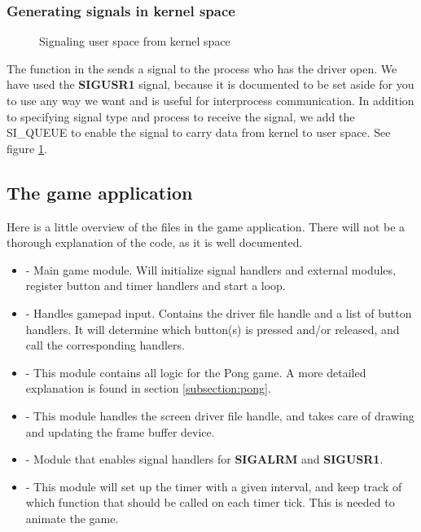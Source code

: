 \subsubsection{Generating signals in kernel space}
\begin{figure}[h]
	\centering
	
	\caption{Signaling user space from kernel space}
	\label{fig:signal-user-application}
\end{figure}
The  function in the  sends a signal to the process who has the driver open. We have used the \textbf{SIGUSR1} signal, because it is documented to be set aside for you to use any way we want and is useful for interprocess communication. In addition to specifying signal type and process to receive the signal, we add the SI\_QUEUE to enable the signal to carry data from kernel to user space. See figure \ref{fig:signal-user-application}.

\subsection{The game application}
Here is a little overview of the files in the game application. There will not be a thorough explanation of the code, as it is well documented.

\begin{itemize}
	\item {} - Main game module. Will initialize signal handlers and external modules, register button and timer handlers and start a  loop. 
	\item {} - Handles gamepad input. Contains the driver file handle and a list of button handlers. It will determine which button(s) is pressed and/or released, and call the corresponding handlers.
	\item {} - This module contains all logic for the Pong game. A more detailed explanation is found in section \ref{subsection:pong}.
	\item {} - This module handles the screen driver file handle, and takes care of drawing and updating the frame buffer device.
	\item {} - Module that enables signal handlers for \textbf{SIGALRM} and \textbf{SIGUSR1}.
	\item {} - This module will set up the timer with a given interval, and keep track of which function that should be called on each timer tick. This is needed to animate the game.
\end{itemize}

